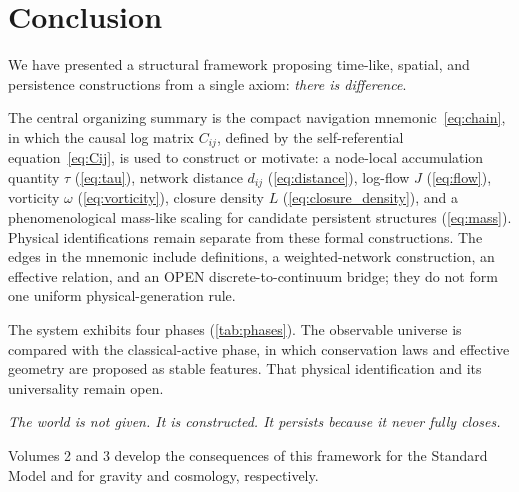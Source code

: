 \section{Conclusion}
\label{sec:conclusion}

We have presented a structural framework proposing time-like, spatial, and
persistence constructions from a single axiom:
\textit{there is difference}.

The central organizing summary is the compact navigation mnemonic~\cref{eq:chain},
in which the causal log matrix $C_{ij}$, defined by the
self-referential equation~\cref{eq:Cij}, is used to construct or motivate:
a node-local accumulation quantity $\tau$ (\cref{eq:tau}),
network distance $d_{ij}$ (\cref{eq:distance}),
log-flow $J$ (\cref{eq:flow}),
vorticity $\omega$ (\cref{eq:vorticity}),
closure density $L$ (\cref{eq:closure_density}),
and a phenomenological mass-like scaling for candidate persistent structures
(\cref{eq:mass}). Physical identifications remain separate from these formal
constructions. The edges in the mnemonic include definitions, a
weighted-network construction, an effective relation, and an OPEN
discrete-to-continuum bridge; they do not form one uniform physical-generation
rule.

The system exhibits four phases (\cref{tab:phases}).
The observable universe is compared with the classical-active phase, in which
conservation laws and effective geometry are proposed as stable features.
That physical identification and its universality remain open.

\bigskip

\begin{keybox}
\textit{The world is not given. It is constructed.
It persists because it never fully closes.}
\end{keybox}

\bigskip

\noindent
Volumes 2 and 3 develop the consequences of this framework
for the Standard Model and for gravity and cosmology, respectively.
